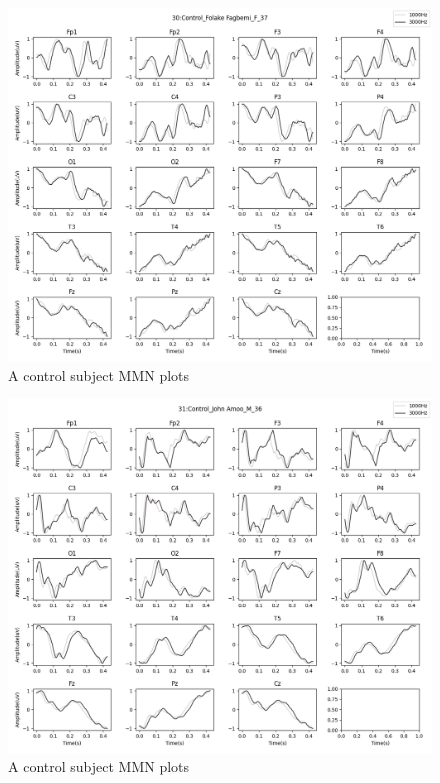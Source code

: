 \documentclass[10pt]{article}
\begin{document}
\begin{figure}[H]
  \includegraphics[width=16cm]{../../../data_analysis_results/MMN/time_series/Control/30.png}
  \caption{A control subject MMN plots}
\end{figure}
\begin{figure}[H]
  \includegraphics[width=16cm]{../../../data_analysis_results/MMN/time_series/Control/31.png}
  \caption{A control subject MMN plots}
\end{figure}
\end{document}
